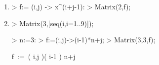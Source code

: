 \begin{enumerate}
\begin{enumerate}
\item
\begin{MapleInput}
> f:= (i,j) -> x^(i+j-1):
> Matrix(2,f);
\end{MapleInput}
\begin{MapleOutput}
\displaystyle  \left[ \begin {array}{cc} x&{x}^{2}\\ {x}^{2}&{x}^{3}\end {array} \right] 
\end{MapleOutput}


\item
\begin{MapleInput}
> Matrix(3,[seq(i,i=1..9)]);
\end{MapleInput}
\begin{MapleOutput}
\displaystyle  {}
\end{MapleOutput}

\begin{MapleInput}
> n:=3:
> f:=(i,j)->(i-1)*n+j;
> Matrix(3,3,f);
\end{MapleInput}
\begin{MapleOutputGather}
\displaystyle f\, := \,( {i,j} )\mapsto  \left( i-1 \right) n+j  \notag \\
\displaystyle  {} \notag
\end{MapleOutputGather}

\end{enumerate}
\end{enumerate}